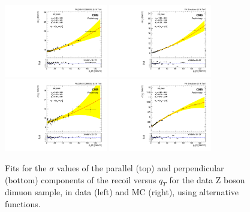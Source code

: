 \begin{figure} [!htbp]
\begin{center}
\includegraphics[width=0.4\textwidth]{Figures/WBoson/Analysis/Correction/Recoil/Syst/SystPt/Data/fitPFu1sigma.pdf}
\includegraphics[width=0.4\textwidth]{Figures/WBoson/Analysis/Correction/Recoil/Syst/SystPt/MC/fitPFu1sigma.pdf} \\
\includegraphics[width=0.4\textwidth]{Figures/WBoson/Analysis/Correction/Recoil/Syst/SystPt/Data/fitPFu2sigma.pdf}
\includegraphics[width=0.4\textwidth]{Figures/WBoson/Analysis/Correction/Recoil/Syst/SystPt/MC/fitPFu2sigma.pdf}
\caption{Fits for the $\sigma$ values of the parallel (top) and perpendicular (bottom) components of the recoil versus $q_{T}$ for the data Z boson dimuon sample, in data (left) and MC (right), using alternative functions.}
\label{fig:figU12RecoilResolutionFit_pol}
\end{center}
\end{figure}

